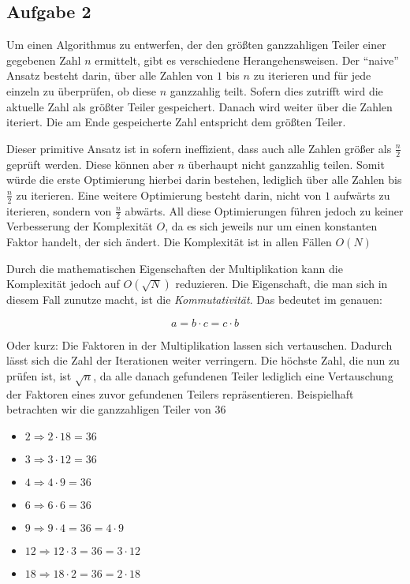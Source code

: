 \documentclass[a4paper,
			   fontsize=12pt]{article}
\begin{document}
\vspace{0,75cm}

\subsection*{Aufgabe 2}
Um einen Algorithmus zu entwerfen, der den größten ganzzahligen Teiler einer gegebenen Zahl $n$ ermittelt, gibt es verschiedene Herangehensweisen. Der "`naive"' Ansatz besteht darin,
über alle Zahlen von $1$ bis $n$ zu iterieren und für jede einzeln zu überprüfen, ob diese $n$ ganzzahlig teilt. Sofern dies zutrifft wird die aktuelle Zahl als größter Teiler gespeichert.
Danach wird weiter über die Zahlen iteriert. Die am Ende gespeicherte Zahl entspricht dem größten Teiler.

Dieser primitive Ansatz ist in sofern ineffizient, dass auch alle Zahlen größer als $\frac{n}{2}$ geprüft werden. Diese können aber $n$ überhaupt nicht ganzzahlig teilen. Somit würde die
erste Optimierung hierbei darin bestehen, lediglich über alle Zahlen bis $\frac{n}{2}$ zu iterieren. Eine weitere Optimierung besteht darin, nicht von $1$ aufwärts zu iterieren, sondern von
$\frac{n}{2}$ abwärts. All diese Optimierungen führen jedoch zu keiner Verbesserung der Komplexität $O$, da es sich jeweils nur um einen konstanten Faktor handelt, der sich ändert. Die Komplexität
ist in allen Fällen $O(N)$

Durch die mathematischen Eigenschaften der Multiplikation kann die Komplexität jedoch auf $O(\sqrt{N})$ reduzieren. Die Eigenschaft, die man sich in diesem Fall zunutze macht, ist die \textit{Kommutativität}. Das bedeutet im genauen:

$$a=b\cdot c = c\cdot b$$

Oder kurz: Die Faktoren in der Multiplikation lassen sich vertauschen. Dadurch lässt sich die Zahl der Iterationen weiter verringern. Die höchste Zahl, die nun zu prüfen ist, ist $\sqrt{n}$, da alle danach gefundenen Teiler
lediglich eine Vertauschung der Faktoren eines zuvor gefundenen Teilers repräsentieren. Beispielhaft betrachten wir die ganzzahligen Teiler von $36$
\begin{itemize}
	\item $2 \Rightarrow 2 \cdot 18 = 36$
	\item $3 \Rightarrow 3 \cdot 12 = 36$
	\item $4 \Rightarrow 4 \cdot 9 = 36$
	\item $6 \Rightarrow 6 \cdot 6 = 36$
	\item $9 \Rightarrow 9 \cdot 4 = 36 = 4 \cdot 9$
	\item $12 \Rightarrow 12 \cdot 3 = 36 = 3 \cdot 12$
	\item $18 \Rightarrow 18 \cdot 2 = 36 = 2 \cdot 18$
\end{itemize}
\end{document}
